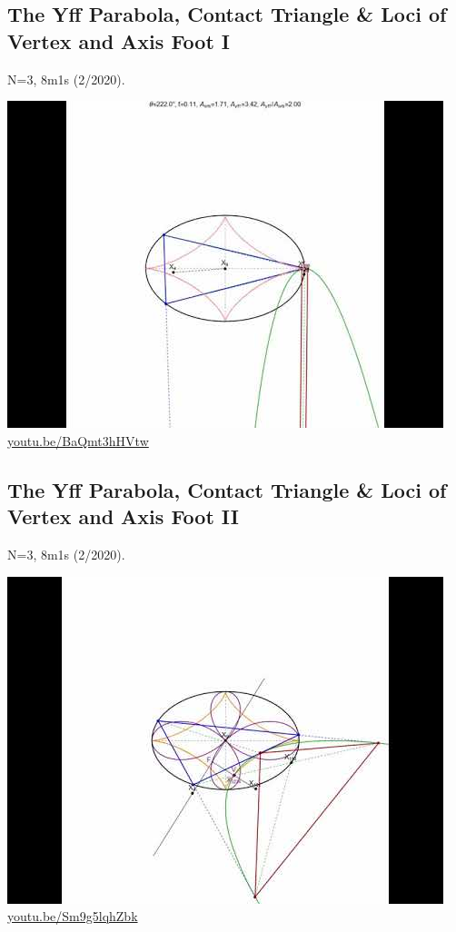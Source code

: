 \documentclass[12pt]{amsart}
\begin{document}
\subsection{The Yff Parabola, Contact Triangle \& Loci of Vertex and Axis Foot I}
\label{vid:BaQmt3hHVtw}
\noindent N=3, 8m1s (2/2020). 
\begin{center}\includegraphics[width=.5\textwidth]{pics/BaQmt3hHVtw.jpg} \\ 
\href{https://youtu.be/BaQmt3hHVtw}{\url{youtu.be/BaQmt3hHVtw}}\end{center}
% 

\subsection{The Yff Parabola, Contact Triangle \& Loci of Vertex and Axis Foot II}
\label{vid:Sm9g5lqhZbk}
\noindent N=3, 8m1s (2/2020). 
\begin{center}\includegraphics[width=.5\textwidth]{pics/Sm9g5lqhZbk.jpg} \\ 
\href{https://youtu.be/Sm9g5lqhZbk}{\url{youtu.be/Sm9g5lqhZbk}}\end{center}
% 
\end{document}
